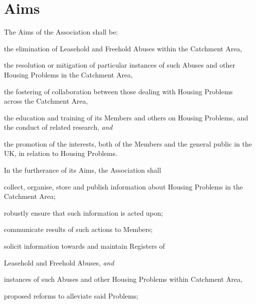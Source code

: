 \documentclass[12pt]{article}
\newcommand{\LAFA}[0]{Leasehold and Freehold Abuses}
\newcommand{\ITand}[0]{\textit{and}}
\begin{document}

\section{Aims}
\begin{constenum}

\item The Aims of the Association shall be:

  \begin{constenum}

  \item the elimination of \LAFA{} within the Catchment Area,

  \item the resolution or mitigation of particular instances of such
    Abuses and other Housing Problems in the Catchment Area,

  \item the fostering of collaboration between those dealing with
    Housing Problems across the Catchment Area,

  \item the education and training of its Members and others on
    Housing Problems, and the conduct of related research, \ITand

  \item the promotion of the interests, both of the Members and the
    general public in the UK, in relation to Housing Problems.

  \end{constenum}

\item In the furtherance of its Aims, the Association shall
\begin{constenum}

  \item collect, organise, store and publish information about
    Housing Problems in the Catchment Area;

  \item robustly ensure that such information is acted upon;

  \item communicate results of such actions to Members;

  \item solicit information towards and maintain Registers of
    \begin{constenum}
    \item \LAFA, \ITand
    \item instances of such Abuses and other Housing Problems within
      Catchment Area,
    \item proposed reforms to alleviate said Problems;
    \end{constenum}


\end{constenum}
\end{constenum}
\end{document}
